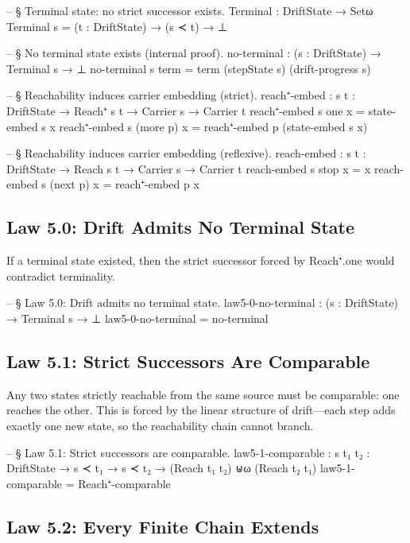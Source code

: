 \documentclass[11pt,a4paper]{book}
\def\texttt#1{#1}%
\begin{document}
\begin{code}
-- § Terminal state: no strict successor exists.
Terminal : DriftState → Setω
Terminal s = (t : DriftState) → (s ≺ t) → ⊥

-- § No terminal state exists (internal proof).
no-terminal : (s : DriftState) → Terminal s → ⊥
no-terminal s term = term (stepState s) (drift-progress s)

-- § Reachability induces carrier embedding (strict).
reach⁺-embed : {s t : DriftState} → Reach⁺ s t → Carrier s → Carrier t
reach⁺-embed {s} one      x = state-embed s x
reach⁺-embed {s} (more p) x = reach⁺-embed p (state-embed s x)

-- § Reachability induces carrier embedding (reflexive).
reach-embed : {s t : DriftState} → Reach s t → Carrier s → Carrier t
reach-embed {s} stop     x = x
reach-embed {s} (next p) x = reach⁺-embed p x
\end{code}

\subsection{Law 5.0: Drift Admits No Terminal State}

If a terminal state existed, then the strict successor forced by \texttt{Reach⁺.one} would contradict terminality.

\begin{code}
-- § Law 5.0: Drift admits no terminal state.
law5-0-no-terminal : (s : DriftState) → Terminal s → ⊥
law5-0-no-terminal = no-terminal
\end{code}

\subsection{Law 5.1: Strict Successors Are Comparable}

Any two states strictly reachable from the same source must be comparable: one reaches the other.
This is forced by the linear structure of drift---each step adds exactly one new state, so the reachability chain cannot branch.

\begin{code}
-- § Law 5.1: Strict successors are comparable.
law5-1-comparable :
  {s t₁ t₂ : DriftState} →
  s ≺ t₁ →
  s ≺ t₂ →
  (Reach t₁ t₂) ⊎ω (Reach t₂ t₁)
law5-1-comparable = Reach⁺-comparable
\end{code}

\subsection{Law 5.2: Every Finite Chain Extends}
\end{document}
